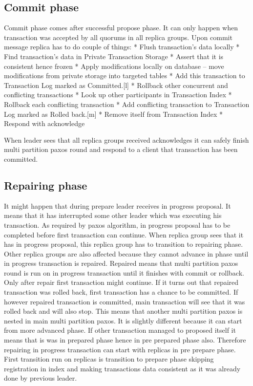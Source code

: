 \subsection{Commit phase}
Commit phase comes after successful propose phase. It can only happen when transaction was accepted by all quorums in all replica groups. Upon commit message replica has to do couple of things:
* Flush transaction’s data locally
   * Find transaction’s data in Private Transaction Storage 
   * Assert that it is consistent hence frozen
   * Apply modifications locally on database -- move modifications from private storage into targeted tables
* Add this transaction to Transaction Log marked as Committed.[l]
* Rollback other concurrent and conflicting transactions
   * Look up other participants in Transaction Index
   * Rollback each conflicting transaction
   * Add conflicting transaction to Transaction Log marked as Rolled back.[m]
* Remove itself from Transaction Index
* Respond with acknowledge


When leader sees that all replica groups received acknowledges it can safely finish multi partition paxos round and respond to a client that transaction has been committed.


\subsection{Repairing phase}
It might happen that during prepare leader receives in progress proposal. It means that it has interrupted some other leader which was executing his transaction. As required by paxos algorithm, in progress proposal has to be completed before first transaction can continue. When replica group sees that it has in progress proposal, this replica group has to transition to repairing phase. 
Other replica groups are also affected because they cannot advance in phase until in progress transaction is repaired. Repaired means that multi partition paxos round is run on in progress transaction until it finishes with commit or rollback. Only after repair first transaction might continue. If it turns out that repaired transaction was rolled back, first transaction has a chance to be committed. If however repaired transaction is committed, main transaction will see that it was rolled back and will also stop.
This means that another multi partition paxos is nested in main multi partition paxos. It is slightly different because it can start from more advanced phase.
If other transaction managed to proposed itself it means that is was in prepared phase hence in pre prepared phase also. Therefore repairing in progress transaction can start with replicas in pre prepare phase. First transition run on replicas is transition to prepare phase skipping registration in index and making transactions data consistent as it was already done by previous leader.


